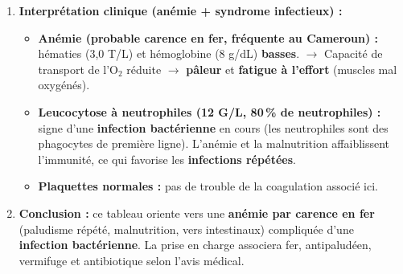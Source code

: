 \documentclass[11pt]{article}
\begin{document}
\begin{exoresolu}
\begin{enumerate}
\begin{center}
\begin{tabularx}{\linewidth}{|l|X|X|}
        \end{tabularx}
        \end{center}
        \item \textbf{Interprétation clinique (anémie + syndrome infectieux) :}
            \begin{itemize}
                \item \textbf{Anémie (probable carence en fer, fréquente au Cameroun) :} hématies (3,0 T/L) et hémoglobine (8 g/dL) \textbf{basses}. $\rightarrow$ Capacité de transport de l'O$_2$ réduite $\rightarrow$ \textbf{pâleur} et \textbf{fatigue à l'effort} (muscles mal oxygénés).
                \item \textbf{Leucocytose à neutrophiles (12 G/L, 80\,\% de neutrophiles) :} signe d'une \textbf{infection bactérienne} en cours (les neutrophiles sont des phagocytes de première ligne). L'anémie et la malnutrition affaiblissent l'immunité, ce qui favorise les \textbf{infections répétées}.
                \item \textbf{Plaquettes normales :} pas de trouble de la coagulation associé ici.
            \end{itemize}
        \item \textbf{Conclusion :} ce tableau oriente vers une \textbf{anémie par carence en fer} (paludisme répété, malnutrition, vers intestinaux) compliquée d'une \textbf{infection bactérienne}. La prise en charge associera fer, antipaludéen, vermifuge et antibiotique selon l'avis médical.
    \end{enumerate}
\end{exoresolu}
\end{document}

